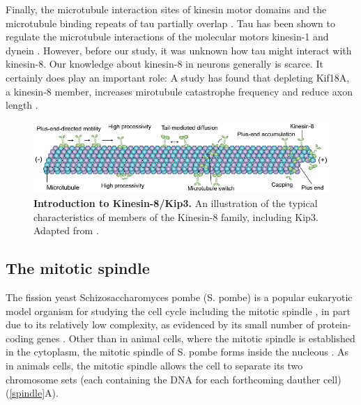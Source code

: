 Finally, the microtubule interaction sites of kinesin motor domains and the microtubule binding repeats of tau partially overlap \parencite{Kellogg2018}. Tau has been shown to regulate the microtubule interactions of the molecular motors kinesin-1 and dynein \parencite{Chaudhary2018,Dixit2008,ebneth1998overexpression,seitz2002single,trinczek1999tau,vershinin2007multiple}. However, before our study, it was unknown how tau might interact with kinesin-8. Our knowledge about kinesin-8 in neurons generally is scarce. It certainly does play an important role: A study has found that depleting Kif18A, a kinesin-8 member, increases mirotubule catastrophe frequency and reduce axon length \parencite{KEVENAAR2016849}.

\begin{figure}[h!tb]
\centering
\includegraphics[width=\linewidth]{Figures/kip3.png}
\caption[Introduction to Kinesin-8/Kip3.]{\textbf{Introduction to Kinesin-8/Kip3.}
An illustration of the typical characteristics of members of the Kinesin-8 family, including Kip3. Adapted from \cite{Lin2020}.
	}\label{kip3}
\end{figure}

\subsection{The mitotic spindle}
\label{sec:spindle}
The fission yeast Schizosaccharomyces pombe (S. pombe) is a popular eukaryotic model organism for studying the cell cycle including the mitotic spindle \parencite{Vyas2021, Uzsoy2021}, in part due to its relatively low complexity, as evidenced by its small number of protein-coding genes \parencite{Wood2002}. Other than in animal cells, where the mitotic spindle is established in the cytoplasm, the mitotic spindle of S. pombe forms inside the nucleous \parencite{Kilmartin2014}. As in animals cells, the mitotic spindle allows the cell to separate its two chromosome sets (each containing the DNA for each forthcoming dauther cell) (\autoref{spindle}A).

